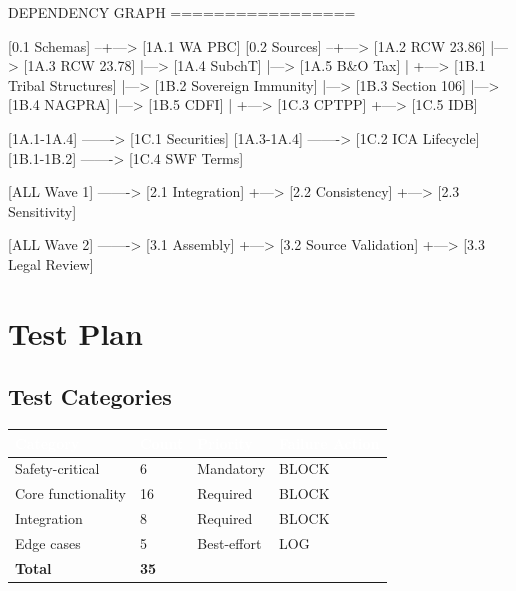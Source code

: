 \documentclass[11pt,letterpaper]{article}
\newcommand{\tableheader}[1]{\textbf{\sffamily\textcolor{white}{#1}}}
\begin{document}
\begin{asciibox}
DEPENDENCY GRAPH
=================

  [0.1 Schemas] --+---> [1A.1 WA PBC]
  [0.2 Sources] --+---> [1A.2 RCW 23.86]
                  |---> [1A.3 RCW 23.78]
                  |---> [1A.4 SubchT]
                  |---> [1A.5 B&O Tax]
                  |
                  +---> [1B.1 Tribal Structures]
                  |---> [1B.2 Sovereign Immunity]
                  |---> [1B.3 Section 106]
                  |---> [1B.4 NAGPRA]
                  |---> [1B.5 CDFI]
                  |
                  +---> [1C.3 CPTPP]
                  +---> [1C.5 IDB]

  [1A.1-1A.4] -------> [1C.1 Securities]
  [1A.3-1A.4] -------> [1C.2 ICA Lifecycle]
  [1B.1-1B.2] -------> [1C.4 SWF Terms]

  [ALL Wave 1] -------> [2.1 Integration]
                  +---> [2.2 Consistency]
                  +---> [2.3 Sensitivity]

  [ALL Wave 2] -------> [3.1 Assembly]
                  +---> [3.2 Source Validation]
                  +---> [3.3 Legal Review]
\end{asciibox}

\section{Test Plan}

\subsection{Test Categories}

\begin{center}
\begin{tabularx}{\textwidth}{L{3cm}C{1.5cm}C{2cm}C{2cm}}
\toprule
{}
\tableheader{Category} & \tableheader{Count} & \tableheader{Priority} & \tableheader{Failure Action} \\
\midrule
Safety-critical & 6 & Mandatory & BLOCK \\
Core functionality & 16 & Required & BLOCK \\
Integration & 8 & Required & BLOCK \\
Edge cases & 5 & Best-effort & LOG \\
\midrule
\textbf{Total} & \textbf{35} & & \\
\bottomrule
\end{tabularx}
\end{center}
\end{document}
